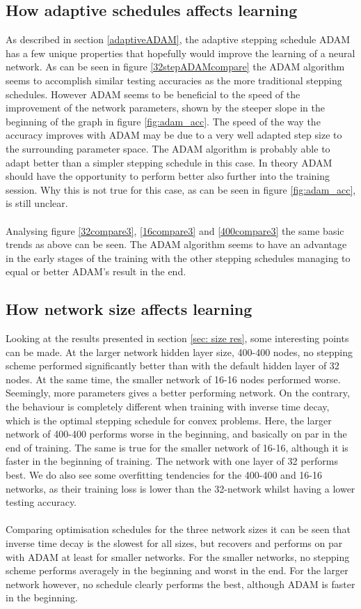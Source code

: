 \documentclass{article}
\begin{document}
\subsection{How adaptive schedules affects learning}

As described in section \ref{adaptiveADAM}, the adaptive stepping schedule ADAM has a few unique properties that hopefully would improve the learning of a neural network. As can be seen in figure \ref{32stepADAMcompare} the ADAM algorithm seems to accomplish similar testing accuracies as the more traditional stepping schedules. However ADAM seems to be beneficial to the speed of the improvement of the network parameters, shown by the steeper slope in the beginning of the graph in figure \ref{fig:adam_acc}. The speed of the way the accuracy improves with ADAM may be due to a very well adapted step size to the surrounding parameter space. The ADAM algorithm is probably able to adapt better than a simpler stepping schedule in this case. In theory ADAM should have the opportunity to perform better also further into the training session. Why this is not true for this case, as can be seen in figure \ref{fig:adam_acc}, is still unclear.\\\\
\noindent Analysing figure \ref{32compare3}, \ref{16compare3} and \ref{400compare3} the same basic trends as above can be seen. The ADAM algorithm seems to have an advantage in the early stages of the training with the other stepping schedules managing to equal or better ADAM's result in the end.   

\subsection{How network size affects learning}
Looking at the results presented in section \ref{sec: size res}, some interesting points can be made. At the larger network hidden layer size, 400-400 nodes, no stepping scheme performed significantly better than with the default hidden layer of 32 nodes. At the same time, the smaller network of 16-16 nodes performed worse. Seemingly, more parameters gives a better performing network. On the contrary, the behaviour is completely different when training with inverse time decay, which is the optimal stepping schedule for convex problems. Here, the larger network of 400-400 performs worse in the beginning, and basically on par in the end of training. The same is true for the smaller network of 16-16, although it is faster in the beginning of training. The network with one layer of 32 performs best. We do also see some overfitting tendencies for the 400-400 and 16-16 networks, as their training loss is lower than the 32-network whilst having a lower testing accuracy. \\\\
\noindent Comparing optimisation schedules for the three network sizes it can be seen that inverse time decay is the slowest for all sizes, but recovers and performs on par with ADAM at least for smaller networks. For the smaller networks, no stepping scheme performs averagely in the beginning and worst in the end. For the larger network however, no schedule clearly performs the best, although ADAM is faster in the beginning. 
\end{document}
